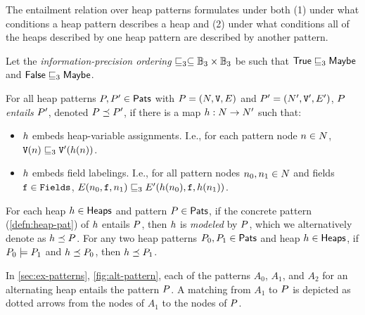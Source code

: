 The entailment relation over heap patterns formulates under both (1)
under what conditions a heap pattern describes a heap and (2) under
what conditions all of the heaps described by one heap pattern are
described by another pattern.
%
\begin{defn}
  \label{defn:match}
  Let the \emph{information-precision ordering} $\sqsubseteq_3 \subseteq
  \mathbb{B}_3 \times \mathbb{B}_3$ be such that $\mathsf{True} \sqsubseteq_3 \mathsf{Maybe}$
  and $\mathsf{False} \sqsubseteq_3 \mathsf{Maybe}$.

  For all heap patterns $P, P' \in \mathsf{Pats}$ with $P =
  (N, \mathtt{V}, E)$ and $P' = (N',
  \mathtt{V}', E')$, $P$ \emph{entails} $P'$, denoted
  $P \preceq P'$, if there is a map $h: N
  \to N'$ such that:
  \begin{itemize}
  \item
    $h$ embeds heap-variable assignments.
    I.e., for each pattern node $n \in N$,
    $\mathtt{V}(n) \sqsubseteq_3 \mathtt{V}'(h(n))$.
  \item
    $h$ embeds field labelings.
    I.e., for all pattern nodes $n_0, n_1 \in N$
    and fields $\mathtt{f} \in \mathtt{Fields}$, $E(n_0, \mathtt{f},
    n_1) \sqsubseteq_3 E'(h(n_0), \mathtt{f},
    h(n_1))$.
  \end{itemize}
\end{defn}
For each heap $h \in \mathsf{Heaps}$ and pattern $P \in \mathsf{Pats}$,
if the concrete pattern (\autoref{defn:heap-pat}) of $h$ entails
$P$, then $h$ is \emph{modeled} by $P$, which we
alternatively denote as $h \preceq P$.
%
For any two heap patterns $P_0, P_1 \in \mathsf{Pats}$ and heap
$h \in \mathsf{Heaps}$, if $P_0 \models P_1$ and $h
\preceq P_0$, then $h \preceq P_1$.
%
\begin{defn}
  \label{ex:pat-entails}
  In \autoref{sec:ex-patterns}, \autoref{fig:alt-pattern}, each of the
  patterns $A_0$, $A_1$, and $A_2$ for an alternating heap entails the
  pattern $P$.
  A matching from $A_1$ to $P$ is depicted as dotted arrows from
  the nodes of $A_1$ to the nodes of $P$.
\end{defn}

